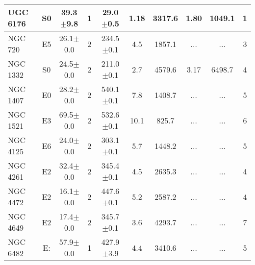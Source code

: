 \begin{table*}
\begin{center}
\begin{tabular}{lccccccccc}
UGC\,6176 & S0 & 39.3$\pm$9.8 & 1 & 29.0$\pm$0.5 & 1.18 & 3317.6 & 1.80 & 1049.1 & 1\\
\hline
NGC\,720  & E5 & 26.1$\pm$0.0 & 2 & 234.5$\pm$0.1 & 4.5 & 1857.1 & ... & ...    & 3\\
NGC\,1332 & S0 & 24.5$\pm$0.0 & 2 & 211.0$\pm$0.1 & 2.7 & 4579.6 & 3.17& 6498.7 & 4\\
NGC\,1407 & E0 & 28.2$\pm$0.0 & 2 & 540.1$\pm$0.1 & 7.8 & 1408.7 & ... & ...    & 5\\
NGC\,1521 & E3 & 69.5$\pm$0.0 & 2 & 532.6$\pm$0.1 &10.1 & 825.7  & ... & ...    & 6\\
NGC\,4125 & E6 & 24.0$\pm$0.0 & 2 & 303.1$\pm$0.1 & 5.7 & 1448.2 & ... & ...    & 5\\
NGC\,4261 & E2 & 32.4$\pm$0.0 & 2 & 345.4$\pm$0.1 & 4.5 & 2635.3 & ... & ...    & 4\\
NGC\,4472 & E2 & 16.1$\pm$0.0 & 2 & 447.6$\pm$0.1 & 5.2 & 2587.2 & ... & ...    & 4\\
NGC\,4649 & E2 & 17.4$\pm$0.0 & 2 & 345.7$\pm$0.1 & 3.6 & 4293.7 & ... & ...    & 7\\
NGC\,6482 & E: & 57.9$\pm$0.0 & 1 & 427.9$\pm$3.9 & 4.4 & 3410.6 & ... & ...    & 5\\
\hline
\end{tabular}
\label{tab:ETG}
\end{center}
\end{table*}